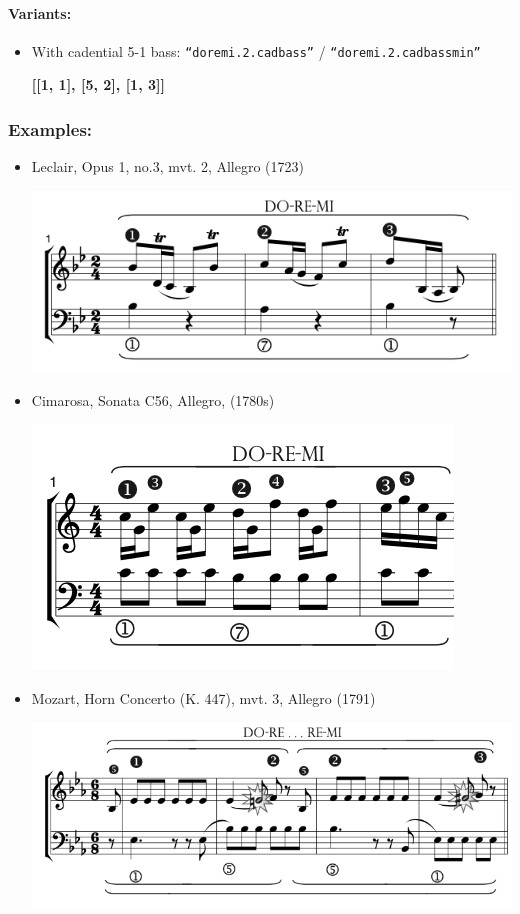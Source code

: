 ﻿\documentclass[11pt, openany]{article}
\begin{document}
\paragraph{Variants:}
\begin{itemize}
\item With cadential 5-1 bass:  \texttt{“doremi.2.cadbass”} / \texttt{“doremi.2.cadbassmin”}
	\begin{center}
    \textbf{[[1, 1], [5, 2], [1, 3]]}
    \end{center}
\end{itemize}

\subsubsection{Examples:}
\begin{itemize}
\item Leclair, Opus 1, no.3, mvt. 2, Allegro (1723)
\begin{center}
\includegraphics[scale=0.5]{leclair1.png}
\end{center}
\item Cimarosa, Sonata C56, Allegro, (1780s)
\begin{center}
\includegraphics[scale=0.5]{cimarosa56.png}
\end{center}
\item Mozart, Horn Concerto (K. 447), mvt. 3, Allegro (1791)
\begin{center}
\includegraphics[scale=0.5]{mozart447.png}
\end{center}
\end{itemize}
\end{document}

